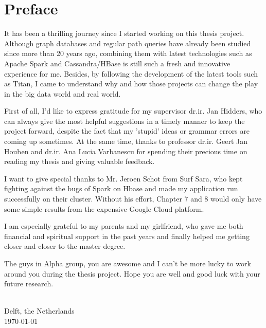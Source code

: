 
\chapter{\label{cha:Preface}Preface}
It has been a thrilling journey since I started working on this thesis project. Although graph databases and regular path queries have already been studied since more than 20 years ago, combining them with latest technologies such as Apache Spark and Cassandra/HBase is still such a fresh and innovative experience for me. Besides, by following the development of the latest tools such as Titan, I came to understand why and how those projects can change the play in the big data world and real world.

First of all, I'd like to express gratitude for my supervisor dr.ir. Jan Hidders, who can always give the most helpful suggestions in a timely manner to keep the project forward, despite the fact that my 'stupid' ideas or grammar errors are coming up sometimes. At the same time, thanks to professor dr.ir. Geert Jan Houben and dr.ir. Ana Lucia Varbanescu for spending their precious time on reading my thesis and giving valuable feedback.

I want to give special thanks to Mr. Jeroen Schot from Surf Sara, who kept fighting against the bugs of Spark on Hbase and
 made my application run successfully on their cluster. Without his effort, Chapter 7 and 8 would only have some simple results from the expensive Google Cloud platform.
 
I am especially grateful to my parents and my girlfriend, who gave me both financial and spiritual support in the past years and finally helped me getting closer and closer to the master degree.

The guys in Alpha group, you are awesome and I can't be more lucky to work around you during the thesis project. Hope you are well and good luck with your future research.

\vskip1cm 

\begin{flushright}
\theauthor\\
 Delft, the Netherlands \\
 \today\\
 
\par\end{flushright}
